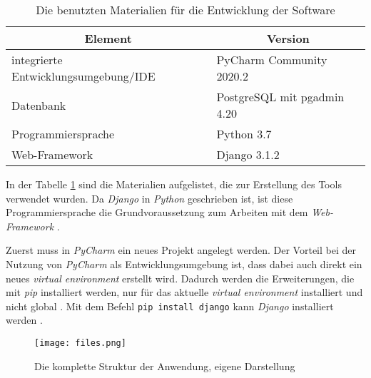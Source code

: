 \documentclass[11pt,a4paper]{report}
\begin{document}
\begin{table}
\centering
\begin{tabular}{|p{}|p{}|}
\hline
\multicolumn{1}{|c|}{\textbf{Element}} & 
\multicolumn{1}{|c|}{\textbf{Version}} \\\hline
integrierte Entwicklungsumgebung/IDE & PyCharm Community 2020.2 \\\hline
Datenbank & PostgreSQL mit pgadmin 4.20 \\\hline
Programmiersprache & Python 3.7 \\\hline   
Web-Framework & Django 3.1.2 \\\hline   
\end{tabular}
\caption{Die benutzten Materialien für die Entwicklung der Software}
\label{t:tools}
\end{table}

In der Tabelle \ref{t:tools} sind die Materialien aufgelistet, die zur Erstellung des Tools verwendet wurden. Da \textit{Django} in \textit{Python} geschrieben ist, ist diese Programmiersprache die Grundvoraussetzung zum Arbeiten mit dem \textit{Web-Framework} \cite{djangotuto2}.


Zuerst muss in \textit{PyCharm} ein neues Projekt angelegt werden. Der Vorteil bei der Nutzung von \textit{PyCharm} als Entwicklungsumgebung ist, dass dabei auch direkt ein neues \textit{virtual environment} erstellt wird. Dadurch werden die Erweiterungen, die mit \textit{pip} installiert werden, nur für das aktuelle \textit{virtual environment} installiert und nicht global \cite{mozillatuto2}. Mit dem Befehl \verb|pip install django| kann \textit{Django} installiert werden \cite{djangotuto3}.


\begin{figure}[htpb]
  \centering
  \texttt{[image: files.png]}
  \caption{Die komplette Struktur der Anwendung, eigene Darstellung}
  \label{f:files}
\end{figure}
\end{document}

